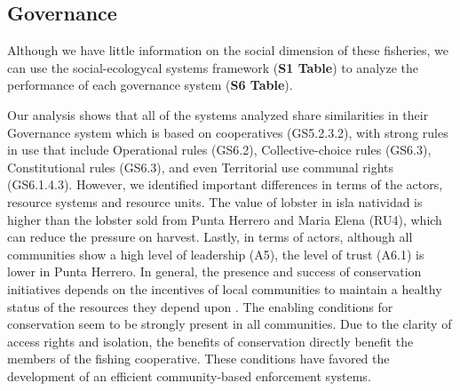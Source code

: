 \documentclass{frontiersSCNS}
\theoremstyle{definition}
\theoremstyle{definition}
\theoremstyle{definition}
\theoremstyle{remark}
\begin{document}
\subsection{Governance}\label{governance}

Although we have little information on the social dimension of these
fisheries, we can use the social-ecologycal systems framework
(\textbf{S1 Table}) to analyze the performance of each governance system
(\textbf{S6 Table}).

Our analysis shows that all of the systems analyzed share similarities
in their Governance system which is based on cooperatives (GS5.2.3.2),
with strong rules in use that include Operational rules (GS6.2),
Collective-choice rules (GS6.3), Constitutional rules (GS6.3), and even
Territorial use communal rights (GS6.1.4.3). However, we identified
important differences in terms of the actors, resource systems and
resource units. The value of lobster in isla natividad is higher than
the lobster sold from Punta Herrero and Maria Elena (RU4), which can
reduce the pressure on harvest. Lastly, in terms of actors, although all
communities show a high level of leadership (A5), the level of trust
(A6.1) is lower in Punta Herrero. In general, the presence and success
of conservation initiatives depends on the incentives of local
communities to maintain a healthy status of the resources they depend
upon \citep{jupiter_2017}. The enabling conditions for conservation seem
to be strongly present in all communities. Due to the clarity of access
rights and isolation, the benefits of conservation directly benefit the
members of the fishing cooperative. These conditions have favored the
development of an efficient community-based enforcement systems.

\clearpage
\end{document}
